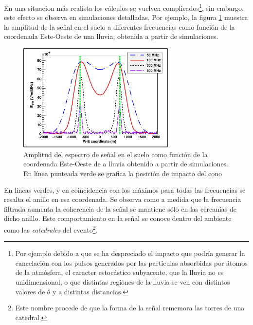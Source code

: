 	En una situacion m\'as realista los c\'alculos se vuelven complicados\footnote{Por ejemplo debido a que se ha despreciado el impacto que podr\'ia generar la cancelaci\'on con los pulsos generados por las part\'iculas absorbidas por \'atomos de la atm\'osfera, el caracter estoc\'astico subyacente, que la lluvia no es unidimensional, o que distintas regiones de la lluvia se ven con distintos valores de $\theta$ y a distintas distancias.}, sin embargo, este efecto se observa en simulaciones detalladas.
	Por ejemplo, la figura \ref{fig:chConeSig} muestra la amplitud de la señal en el suelo a diferentes frecuencias como función de la coordenada Este-Oeste de una lluvia, obtenida a partir de simulaciones.
	\begin{figure}[ht!]
	\centering
		\includegraphics[width=0.7\textwidth]{fig/EASRadio/chConeSig}
		\caption{\label{fig:chConeSig} Amplitud del espectro de se\~nal en el suelo como funci\'on de la coordenada Este-Oeste de a lluvia obtenido a partir de simulaciones. En l\'inea punteada verde se grafica la posici\'on de impacto del cono \cher{}}
	\end{figure}
	En l\'ineas verdes, y en coincidencia con los máximos para todas las frecuencias se resalta el anillo \cher{} en esa coordenada.
	Se observa como a medida que la frecuencia filtrada aumenta la coherencia de la se\~nal se mantiene sólo en las cercan\'ias de dicho anillo.
	Este comportamiento en la se\~nal se conoce dentro del ambiente como las \emph{catedrales} del evento\footnote{Este nombre procede de que la forma de la se\~nal rememora las torres de una catedral.}.
	
